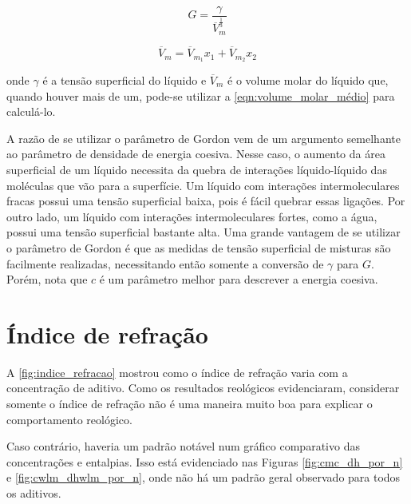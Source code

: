 		\begin{equation}
			G = \dfrac{\gamma}{\overline{V}_m^{\frac{1}{3}}}
			\label{eqn:Gordon}
		\end{equation}
		
		\begin{equation}
			\overline{V}_m = \overline{V}_{m_{1}}x_1 + \overline{V}_{m_{2}}x_2
			\label{eqn:volume_molar_médio}
		\end{equation}
		
		\noindent onde \(\gamma\) é a tensão superficial do líquido e \(\overline{V}_m\) é o volume molar do líquido que, quando houver mais de um, pode-se utilizar a \autoref{eqn:volume_molar_médio} para calculá-lo. 
		
		A razão de se utilizar o parâmetro de Gordon vem de um argumento semelhante ao parâmetro de densidade de energia coesiva. Nesse caso, o aumento da área superficial de um líquido necessita da quebra de interações líquido-líquido das moléculas que vão para a superfície. Um líquido com interações intermoleculares fracas possui uma tensão superficial baixa, pois é fácil quebrar essas ligações. Por outro lado, um líquido com interações intermoleculares fortes, como a água, possui uma tensão superficial bastante alta. Uma grande vantagem de se utilizar o parâmetro de Gordon é que as medidas de tensão superficial de misturas são facilmente realizadas, necessitando então somente a conversão de \(\gamma\) para \(G\). Porém, \citeauthor{ReichardtSolvents} nota que \(c\) é um parâmetro melhor para descrever a energia coesiva.

		\section{Índice de refração} 
		
		A \autoref{fig:indice_refracao} mostrou como o índice de refração varia com a concentração de aditivo. Como os resultados reológicos evidenciaram, considerar somente o índice de refração não é uma maneira muito boa para explicar o comportamento reológico.
		
		Caso contrário, haveria um padrão notável num gráfico comparativo das concentrações e entalpias. Isso está evidenciado nas Figuras \ref{fig:cmc_dh_por_n} e \ref{fig:cwlm_dhwlm_por_n}, onde não há um padrão geral observado para todos os aditivos.
		
